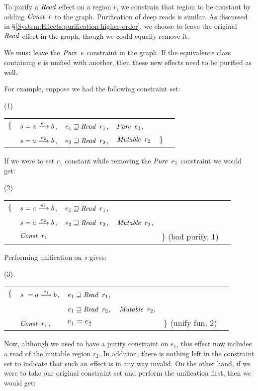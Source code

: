 To purify a $\operatorname{\mathit{Read}}$ effect on a region $r$, we constrain that region to be constant by adding $\operatorname{\mathit{Const}} \ r$ to the graph. Purification of deep reads is similar. As discussed in \S\ref{System:Effects:purification-higher-order}, we choose to leave the original $\operatorname{\mathit{Read}}$ effect in the graph, though we could equally remove it.

We must leave the $\operatorname{\mathit{Pure}} \ e$ constraint in the graph. If the equivalence class containing $e$ is unified with another, then these new effects need to be purified as well. 

For example, suppose we had the following constraint set:

\qq (1) \quad
\begin{tabular}{llllll}
	$\{$
	& $s = a \stackrel{e_1}{\longrightarrow} b$,	& $e_1 \sqsupseteq \operatorname{\mathit{Read}} \ r_1$, 	& $\iPure \ e_1$, \\
	& $s = a \stackrel{e_2}{\longrightarrow} b$, 	& $e_2 \sqsupseteq \operatorname{\mathit{Read}} \ r_2$, 	& $\iMutable \ r_2$
	& $\}$
\end{tabular}
\bigskip

If we were to set $r_1$ constant while removing the $\iPure \ e_1$ constraint we would get:

\qq (2) \quad
\begin{tabular}{llllll}
	$\{$
	& $s = a \stackrel{e_1}{\longrightarrow} b$, 	& $e_1 \sqsupseteq \operatorname{\mathit{Read}} \ r_1$,	& \\
	& $s = a \stackrel{e_2}{\longrightarrow} b$, 	& $e_2 \sqsupseteq \operatorname{\mathit{Read}} \ r_2$, 	& $\iMutable \ r_2$, \\
	& $\iConst \ r_1$ 		&				&	
	& $\}$ \qq	(bad purify, 1)
\end{tabular}
\bigskip

\clearpage{}
Performing unification on $s$ gives:

\qq (3) \quad
\begin{tabular}{llllll}
	$\{$
	& $s \ = a \stackrel{e_1}{\longrightarrow} b$,	& $e_1 \sqsupseteq \operatorname{\mathit{Read}} \ r_1$,	& \\
	& 	 			& $e_1 \sqsupseteq \operatorname{\mathit{Read}} \ r_2$,	& $\iMutable \ r_2$, \\
	& $\iConst \ r_1$, 		& $e_1 = e_2$			&	
	& $\}$ \qq	(unify fun, 2)
\end{tabular}
\bigskip

Now, although we used to have a purity constraint on $e_1$, this effect now includes a read of the mutable region $r_2$. In addition, there is nothing left in the constraint set to indicate that such an effect is in any way invalid. On the other hand, if we were to take our original constraint set and perform the unification first, then we would get:

